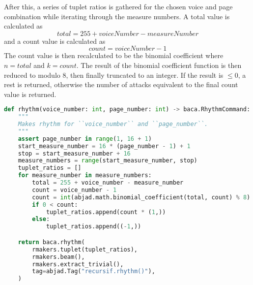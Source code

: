After this, a series of tuplet ratios is gathered for the chosen voice and page combination while iterating through the measure numbers. A total value is calculated as \begin{equation}total = 255 + voiceNumber - measureNumber\end{equation} and a count value is calculated as \begin{equation}count = voiceNumber - 1\end{equation} The count value is then recalculated to be the binomial coefficient where $n=total$ and $k=count$. The result of the binomial coefficient function is then reduced to modulo 8, then finally truncated to an integer. If the result is $\leq 0$, a rest is returned, otherwise the number of attacks equivalent to the final count value is returned.

\begin{lstlisting}[language=Python,frame=tb,caption={Po\`eme r\'ecursif rhythm function},label=lst:recursifrhythm]
def rhythm(voice_number: int, page_number: int) -> baca.RhythmCommand:
    """
    Makes rhythm for ``voice_number`` and ``page_number``.
    """
    assert page_number in range(1, 16 + 1)
    start_measure_number = 16 * (page_number - 1) + 1
    stop = start_measure_number + 16
    measure_numbers = range(start_measure_number, stop)
    tuplet_ratios = []
    for measure_number in measure_numbers:
        total = 255 + voice_number - measure_number
        count = voice_number - 1
        count = int(abjad.math.binomial_coefficient(total, count) % 8)
        if 0 < count:
            tuplet_ratios.append(count * (1,))
        else:
            tuplet_ratios.append((-1,))

    return baca.rhythm(
        rmakers.tuplet(tuplet_ratios),
        rmakers.beam(),
        rmakers.extract_trivial(),
        tag=abjad.Tag("recursif.rhythm()"),
    )
\end{lstlisting}

